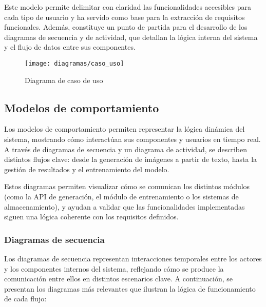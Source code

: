 Este modelo permite delimitar con claridad las funcionalidades accesibles para cada tipo de usuario y ha servido como base para la extracción de requisitos funcionales. Además, constituye un punto de partida para el desarrollo de los diagramas de secuencia y de actividad, que detallan la lógica interna del sistema y el flujo de datos entre sus componentes.

\begin{figure}[H]
    \centering
    \texttt{[image: diagramas/caso\_uso]}
    \caption{Diagrama de caso de uso}
    \label{fig:caso-uso}
\end{figure}


\subsection{Modelos de comportamiento}
Los modelos de comportamiento permiten representar la lógica dinámica del sistema, mostrando cómo interactúan sus componentes y usuarios en tiempo real. A través de diagramas de secuencia y un diagrama de actividad, se describen distintos flujos clave: desde la generación de imágenes a partir de texto, hasta la gestión de resultados y el entrenamiento del modelo.

Estos diagramas permiten visualizar cómo se comunican los distintos módulos (como la API de generación, el módulo de entrenamiento o los sistemas de almacenamiento), y ayudan a validar que las funcionalidades implementadas siguen una lógica coherente con los requisitos definidos.

\subsubsection{Diagramas de secuencia}

Los diagramas de secuencia representan interacciones temporales entre los actores y los componentes internos del sistema, reflejando cómo se produce la comunicación entre ellos en distintos escenarios clave. A continuación, se presentan los diagramas más relevantes que ilustran la lógica de funcionamiento de cada flujo:


